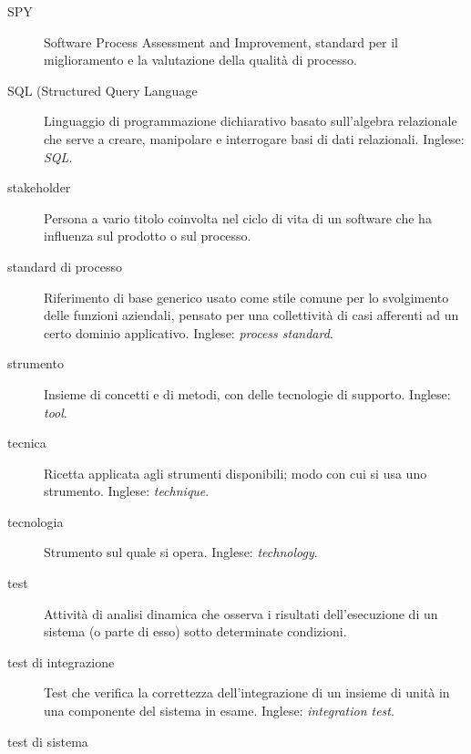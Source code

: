 \documentclass[a4paper]{article}
\begin{document}
\begin{description}
	\item[SPY] 

			Software Process Assessment and Improvement, standard per il miglioramento e la valutazione della qualità di processo.
			
	\item[SQL (Structured Query Language] 

			Linguaggio di programmazione dichiarativo basato sull'algebra relazionale che serve a creare, manipolare e interrogare basi di dati relazionali. Inglese: \emph{SQL}.
			
	\item[stakeholder] 

			Persona a vario titolo coinvolta nel ciclo di vita di un software che ha influenza sul prodotto o sul processo.
			
	\item[standard di processo] 

			Riferimento di base generico usato come stile comune per lo svolgimento delle funzioni aziendali, pensato per una collettività di casi afferenti ad un certo dominio applicativo. Inglese: \emph{process standard}.
			
	\item[strumento] 

			Insieme di concetti e di metodi, con delle tecnologie di supporto. Inglese: \emph{tool}.
			
	\item[tecnica] 

			Ricetta applicata agli strumenti disponibili; modo con cui si usa uno strumento. Inglese: \emph{technique}.
			
	\item[tecnologia] 

			Strumento sul quale si opera. Inglese: \emph{technology}.
			
	\item[test] 

			Attività di analisi dinamica che osserva i risultati dell'esecuzione di un sistema (o parte di esso) sotto determinate condizioni.
			
	\item[test di integrazione] 

			Test che verifica la correttezza dell'integrazione di un insieme di unità in una componente del sistema in esame. Inglese: \emph{integration test}.
			
	\item[test di sistema] 


\end{description}
\end{document}
